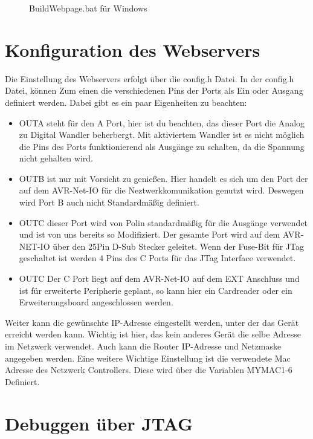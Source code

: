 \begin{figure}[H]

\caption{BuildWebpage.bat für Windows}
\label{output}
\end{figure}

\section{Konfiguration des Webservers}

Die Einstellung des Webservers erfolgt über die \textrm{config.h} Datei. In der
\textrm{config.h} Datei, können Zum einen die verschiedenen Pins der Ports als Ein oder
Ausgang definiert werden. Dabei gibt es ein paar Eigenheiten zu beachten:
\begin{itemize}
  \item OUTA steht für den A Port, hier ist du beachten, das dieser Port die
  Analog zu Digital Wandler beherbergt. Mit aktiviertem Wandler ist es nicht
  möglich die Pins des Ports funktionierend als Ausgänge zu schalten, da die
  Spannung nicht gehalten wird.
  \item OUTB ist nur mit Vorsicht zu genießen. Hier handelt es sich um den Port
  der auf dem AVR-Net-IO für die Neztwerkkomunikation genutzt wird. Deswegen
  wird Port B auch nicht Standardmäßig definiert.
  \item OUTC dieser Port wird von Polin standardmäßig für die Ausgänge verwendet
  und ist von uns bereits so Modifiziert. Der gesamte Port wird auf dem
  AVR-NET-IO über den 25Pin D-Sub Stecker geleitet. Wenn der Fuse-Bit für JTag
  geschaltet ist werden 4 Pins des C Ports für das JTag Interface verwendet.
  \item OUTC Der C Port liegt auf dem AVR-Net-IO auf dem EXT Anschluss und ist
  für erweiterte Peripherie geplant, so kann hier ein Cardreader oder ein
  Erweiterungsboard angeschlossen werden.
\end{itemize}
Weiter kann die gewünschte IP-Adresse eingestellt werden, unter der das Gerät
erreicht werden kann. Wichtig ist hier, das kein anderes Gerät die selbe Adresse
im Netzwerk verwendet. Auch kann die Router IP-Adresse und Netzmaske angegeben
werden. Eine weitere Wichtige Einstellung ist die verwendete Mac Adresse
des Netzwerk Controllers. Diese wird über die Variablen MYMAC1-6 Definiert.

\section{Debuggen über JTAG}

